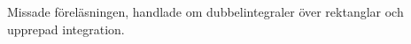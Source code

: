 \documentclass[a4paper]{article}
\begin{document}
\providecommand\fname{}
\renewcommand\fname{19-09-24}

Missade föreläsningen, handlade om dubbelintegraler över rektanglar och 
upprepad integration.
\end{document}
